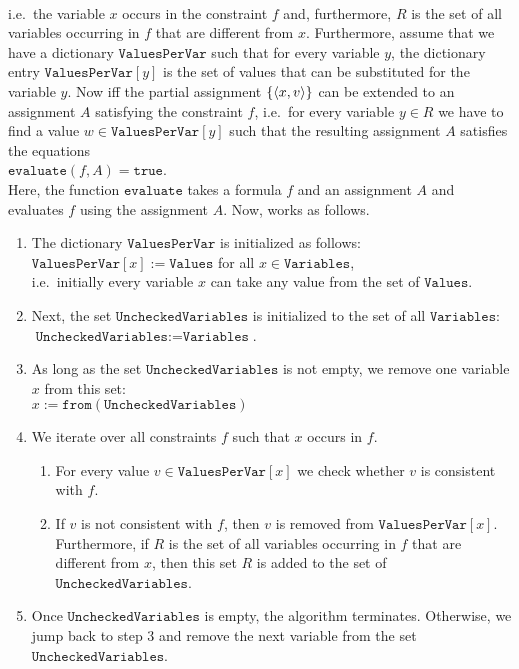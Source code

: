 \\[0.2cm]
i.e.~the variable $x$ occurs in the constraint $f$ and, furthermore, $R$ is the set of all variables occurring
in $f$ that are different from $x$.  Furthermore, assume that we have a dictionary $\texttt{ValuesPerVar}$ such that
for every variable $y$, the dictionary entry $\texttt{ValuesPerVar}[y]$ is the set of values that can be substituted
for the variable $y$.  Now   
iff the partial assignment $\{ \pair(x, v) \}$ can be extended to an assignment $A$ satisfying the constraint $f$,
i.e.~for every variable $y \in R$ we have to find a value $w \in \texttt{ValuesPerVar}[y]$ such that the resulting
assignment $A$ satisfies the equations
\\[0.2cm]
\hspace*{1.3cm}
$\texttt{evaluate}(f, A) = \texttt{true}$.
\\[0.2cm]
Here, the function $\texttt{evaluate}$ takes a formula $f$ and an assignment $A$ and evaluates $f$ using the
assignment $A$.  Now,  works as follows.
\begin{enumerate}
\item The dictionary $\texttt{ValuesPerVar}$ is initialized as follows:
      \\[0.2cm]
      \hspace*{1.3cm}
      $\texttt{ValuesPerVar}[x] := \texttt{Values}$ \quad for all $x \in \texttt{Variables}$,
      \\[0.2cm]
      i.e.~initially every variable $x$ can take any value from the set of $\texttt{Values}$.
\item Next, the set $\texttt{UncheckedVariables}$ is initialized to the set of all $\texttt{Variables}$:
      \\[0.2cm]
      \hspace*{1.3cm}
      $\texttt{UncheckedVariables} := \texttt{Variables}$.
\item As long as the set $\texttt{UncheckedVariables}$ is not empty, we remove one variable $x$ from this set:
      \\[0.2cm]
      \hspace*{1.3cm}
      $x := \texttt{from}(\texttt{UncheckedVariables})$
\item We iterate over all constraints $f$ such that $x$ occurs in $f$.  
      \begin{enumerate}
      \item For every value $v \in \texttt{ValuesPerVar}[x]$ we check whether $v$ is consistent with $f$.
      \item If $v$ is not consistent with $f$, then $v$ is removed from $\texttt{ValuesPerVar}[x]$.
            Furthermore, if $R$ is the set of all variables occurring in $f$ that are different from $x$, 
            then this set $R$ is added to the set of $\texttt{UncheckedVariables}$.
      \end{enumerate}
\item Once $\texttt{UncheckedVariables}$ is empty, the algorithm terminates.  Otherwise, we jump back to step 3
      and remove the next variable from the set $\texttt{UncheckedVariables}$.
\end{enumerate}
